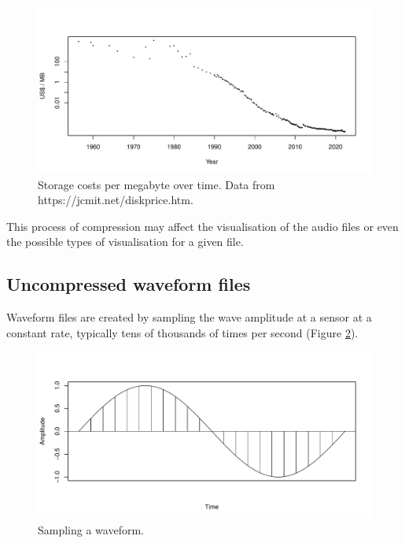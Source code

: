 \documentclass[
]{book}
\begin{document}
\begin{figure}

{\centering \includegraphics[width=0.9\linewidth]{_main_files/figure-latex/storage-costs-1} 

}

\caption{Storage costs per megabyte over time. Data from https://jcmit.net/diskprice.htm.}\label{fig:storage-costs}
\end{figure}

This process of compression may affect the visualisation of the audio files or even the possible types of visualisation for a given file.

\hypertarget{uncompressed-waveform-files}{%
\subsection{Uncompressed waveform files}\label{uncompressed-waveform-files}}

Waveform files are created by sampling the wave amplitude at a sensor at a constant rate, typically tens of thousands of times per second (Figure \ref{fig:wave-sampling}).

\begin{figure}

{\centering \includegraphics[width=0.9\linewidth]{_main_files/figure-latex/wave-sampling-1} 

}

\caption{Sampling a waveform.}\label{fig:wave-sampling}
\end{figure}
\end{document}
